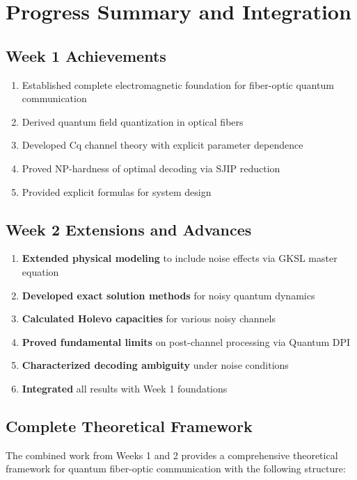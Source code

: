 \documentclass[12pt,a4paper]{article}
\begin{document}
\section{Progress Summary and Integration}
\label{sec:progress_summary}

\subsection{Week 1 Achievements}
\begin{enumerate}
    \item Established complete electromagnetic foundation for fiber-optic quantum communication
    \item Derived quantum field quantization in optical fibers
    \item Developed Cq channel theory with explicit parameter dependence
    \item Proved NP-hardness of optimal decoding via SJIP reduction
    \item Provided explicit formulas for system design
\end{enumerate}

\subsection{Week 2 Extensions and Advances}
\begin{enumerate}
    \item \textbf{Extended physical modeling} to include noise effects via GKSL master equation
    \item \textbf{Developed exact solution methods} for noisy quantum dynamics
    \item \textbf{Calculated Holevo capacities} for various noisy channels
    \item \textbf{Proved fundamental limits} on post-channel processing via Quantum DPI
    \item \textbf{Characterized decoding ambiguity} under noise conditions
    \item \textbf{Integrated} all results with Week 1 foundations
\end{enumerate}

\subsection{Complete Theoretical Framework}
The combined work from Weeks 1 and 2 provides a comprehensive theoretical framework for quantum fiber-optic communication with the following structure:
\end{document}
